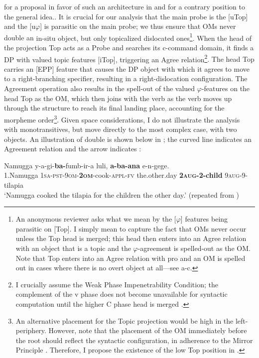 \documentclass[output=paper
,newtxmath
,modfonts
,nonflat]{langsci/langscibook}
\begin{document}
{\citet{landmantoappear} for a proposal in favor of such an architecture in  and \citet{horvath2007} for a contrary position to the general idea.}\textup{. It is crucial for our analysis that the main probe is the [uTop] and the [u$\varphi $] is parasitic on the main probe; we thus ensure that OMs never double an} in-situ \textup{object, but only topicalized dislocated ones}\footnote{An anonymous reviewer asks what we mean by the [$\varphi $] features being parasitic on [Top]. I simply mean to capture the fact that OMs never occur unless the Top head is merged; this head then enters into an Agree relation with an object that is a topic and the $\varphi $-agreement is spelled-out as the OM. Note that Top enters into an Agree relation with pro and an OM is spelled out in cases where there is no overt object at all—see a-c.}\textup{. When the head of the projection Top acts as a Probe and searches its c-command domain, it finds a DP with valued topic features [iTop], triggering an Agree relation}\footnote{I crucially assume the Weak Phase Impenetrability Condition; the complement of the v phase does not become unavailable for syntactic computation until the higher C phase head is merged \citep{Citko2014}.}\textup{. The head Top carries an [EPP] feature that causes the DP object with which it agrees to move to a right-branching specifier, resulting in a right-dislocation configuration. The Agreement operation also results in the spell-out of the valued $\varphi $-features on the head Top as the  OM, which then joins with the verb as the verb moves up through the structure to reach its final landing place, accounting for the morpheme order}\footnote{An alternative placement for the Topic projection would be high in the left-periphery. However, note that the placement of the OM immediately before the root should reflect the syntactic configuration, in adherence to the Mirror Principle \citep{Baker1985}. Therefore, I propose the existence of the low Top position in .}\textup{. Given space considerations, I do not illustrate the analysis with monotransitives, but move directly to the most complex case, with two objects. An illustration of double  is shown below in ; the curved line indicates an Agreement relation and the arrow indicates :}

\ea\label{ex:ranero:31}
\gll Namugga     y-a-gi{}-\textbf{ba-}fumb-ir-a                     luli,                \textbf{a-ba-ana}      e-n-gege.\\
1.Namugga \textsc{1sa-pst-9om}\textsc{{}-}\textbf{\textsc{2om}}{}-cook-\textsc{appl-fv} the.other.day \textbf{2\textsc{aug}}\textbf{{}-2-child} 9\textsc{aug}{}-9-tilapia\\
\glt ‘Namugga cooked the tilapia for the children the other day.’ (repeated from )
\end{document}
